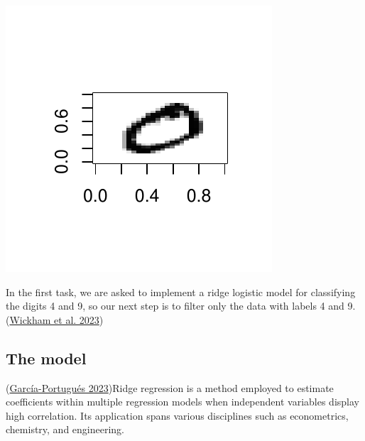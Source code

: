 \documentclass[
  10pt,
]{article}
\newenvironment{Shaded}{\begin{snugshade}}{\end{snugshade}}
\newcommand{\CommentTok}[1]{\textcolor[rgb]{0.56,0.35,0.01}{\textit{#1}}}
\newcommand{\DecValTok}[1]{\textcolor[rgb]{0.00,0.00,0.81}{#1}}
\newcommand{\FunctionTok}[1]{\textcolor[rgb]{0.13,0.29,0.53}{\textbf{#1}}}
\newcommand{\NormalTok}[1]{#1}
\newcommand{\OtherTok}[1]{\textcolor[rgb]{0.56,0.35,0.01}{#1}}
\newcommand{\SpecialCharTok}[1]{\textcolor[rgb]{0.81,0.36,0.00}{\textbf{#1}}}
\begin{document}
\begin{center}\includegraphics{Task1_files/figure-latex/visualize-1} \end{center}

In the first task, we are asked to implement a ridge logistic model for
classifying the digits 4 and 9, so our next step is to filter only the
data with labels 4 and 9. (\protect\hyperlink{ref-dplyr}{Wickham et al.
2023})

\begin{Shaded}
\end{Shaded}

\hypertarget{the-model}{%
\subsection{The model}\label{the-model}}

(\protect\hyperlink{ref-Garcia-Portugues2023}{García-Portugués
2023})Ridge regression is a method employed to estimate coefficients
within multiple regression models when independent variables display
high correlation. Its application spans various disciplines such as
econometrics, chemistry, and engineering.
\end{document}
